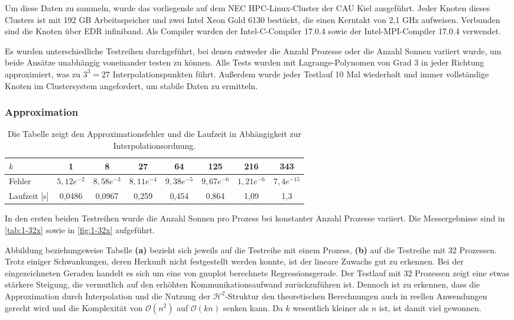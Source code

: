   Um diese Daten zu sammeln, wurde das vorliegende auf dem NEC HPC-Linux-Cluster der CAU Kiel ausgeführt. Jeder Knoten dieses Clusters ist mit 192 GB Arbeitsspeicher und zwei Intel Xeon Gold 
  6130 bestückt, die einen Kerntakt von 2,1 GHz aufweisen. Verbunden sind die Knoten über EDR infiniband. Als Compiler wurden der Intel-C-Compiler 17.0.4 sowie der Intel-MPI-Compiler 17.0.4 verwendet.
  
  Es wurden unterschiedliche Testreihen durchgeführt, bei denen entweder die Anzahl Prozesse oder die Anzahl Sonnen variiert wurde, um beide Ansätze unabhängig voneinander testen zu können.
  Alle Tests wurden mit Lagrange-Polynomen von Grad $3$ in jeder Richtung approximiert, was zu $3^3 = 27$ Interpolationspunkten führt. Außerdem wurde jeder Testlauf 10 Mal wiederholt und immer 
  vollständige Knoten im Clustersystem angefordert, um stabile Daten zu ermitteln.
  
  \subsubsection{Approximation}
  
  
  \begin{table}[b]
    \begin{tabular}{|l|c c c c c c c|}
    \hline
    $k$ & 1 & 8 & 27 & 64 & 125 & 216 & 343\\
    \hline
    Fehler & $5,12e^{-2}$ & $8,58e^{-3}$ & $8,11e^{-4}$ & $9,38e^{-5}$ & $9,67e^{-6}$ & $1,21e^{-6}$ & $7,4e^{-15}$\\
    \hline
    Laufzeit [s] & 0,0486 & 0,0967 & 0,259 & 0,454 & 0,864 & 1,09 & 1,3\\
    \hline
    \end{tabular}
    \caption{Die Tabelle zeigt den Approximationsfehler und die Laufzeit in Abhängigkeit zur Interpolationsordnung.}
    \label{tab:error}
  \end{table}
  
  In den ersten beiden Testreihen wurde die Anzahl Sonnen pro Prozess bei konstanter Anzahl Prozesse variiert. Die Messergebnisse sind in \autoref{tab:1-32x} sowie in \autoref{fig:1-32x} 
  aufgeführt.
  
  Abbildung beziehungsweise Tabelle \textbf{(a)} bezieht sich jeweils auf die Testreihe mit einem Prozess, \textbf{(b)} auf die Testreihe mit 32 Prozessen. Trotz einiger Schwankungen, deren Herkunft
  nicht festgestellt werden konnte, ist der lineare Zuwachs gut zu erkennen. Bei der eingezeichneten Geraden handelt es sich um eine von gnuplot berechnete Regressionsgerade. Der Testlauf mit $32$ 
  Prozessen zeigt eine etwas stärkere Steigung, die vermutlich auf den erhöhten Kommunikationsaufwand zurückzuführen ist. Dennoch ist zu erkennen, dass die Approximation durch Interpolation und die 
  Nutzung der $\mathcal{H}^2$-Struktur den theoretischen Berechnungen auch in reellen Anwendungen gerecht wird und die Komplexität von $\mathcal{O}(n^2)$ auf $\mathcal{O}(k n)$ senken kann. Da $k$ 
  wesentlich kleiner als $n$ ist, ist damit viel gewonnen.
  

